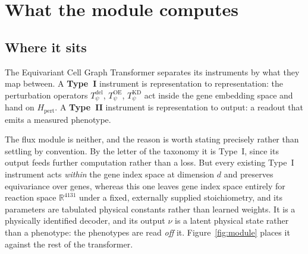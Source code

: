 
\section{What the module computes}
\label{sec:what}

\subsection{Where it sits}

The Equivariant Cell Graph Transformer separates its instruments by what they map between.
A \textbf{Type~I} instrument is representation to representation: the perturbation
operators $T_\psi^{\mathrm{del}}$, $T_\psi^{\mathrm{OE}}$, $T_\psi^{\mathrm{KD}}$ act
inside the gene embedding space and hand on $H_{\mathrm{pert}}$. A \textbf{Type~II}
instrument is representation to output: a readout that emits a measured phenotype.

The flux module is neither, and the reason is worth stating precisely rather than settling
by convention. By the letter of the taxonomy it is Type~I, since its output feeds further
computation rather than a loss. But every existing Type~I instrument acts \emph{within} the
gene index space at dimension $d$ and preserves equivariance over genes, whereas this one
leaves gene index space entirely for reaction space $\mathbb{R}^{4131}$ under a fixed,
externally supplied stoichiometry, and its parameters are tabulated physical constants
rather than learned weights. It is a physically identified decoder, and its output
$\nu$ is a latent physical state rather than a phenotype: the phenotypes are read
\emph{off} it. Figure~\ref{fig:module} places it against the rest of the transformer.

